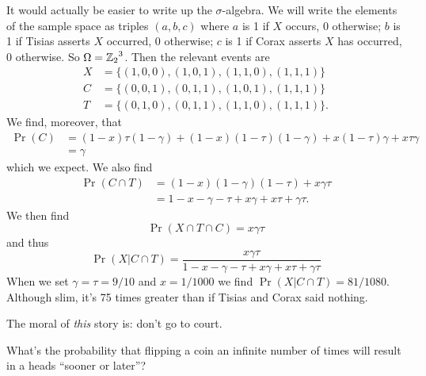 It would actually be easier to write up the $\sigma$-algebra. We will
write the elements of the sample space as triples $(a,b,c)$ where $a$ is
1 if $X$ occurs, 0 otherwise; $b$ is 1 if Tisias asserts $X$ occurred, 0
otherwise; $c$ is 1 if Corax asserts $X$ has occurred, 0 otherwise. So
$\Omega={\mathbb{Z}_{2}}^{3}$. Then the relevant events are
\begin{subequations}
\begin{align}
X&=\{(1,0,0),(1,0,1),(1,1,0),(1,1,1)\}\\
C&=\{(0,0,1),(0,1,1),(1,0,1),(1,1,1)\}\\
T&=\{(0,1,0),(0,1,1),(1,1,0),(1,1,1)\}.
\end{align}
\end{subequations}
We find, moreover, that
\begin{equation}
\begin{split}
\Pr(C)&=(1-x)\tau(1-\gamma)+(1-x)(1-\tau)(1-\gamma)+x(1-\tau)\gamma+x\tau\gamma\\
&=\gamma
\end{split}
\end{equation}
which we expect. We also find
\begin{equation}
\begin{split}
\Pr(C\cap T)&=(1-x)(1-\gamma)(1-\tau)+x\gamma\tau\\
&=1-x-\gamma-\tau+x\gamma+x\tau+\gamma\tau.
\end{split}
\end{equation}
We then find
\begin{equation}
\Pr(X\cap T\cap C)=x\gamma\tau
\end{equation}
and thus
\begin{equation}
\Pr(X|C\cap T)=\frac{x\gamma\tau}{1-x-\gamma-\tau+x\gamma+x\tau+\gamma\tau}
\end{equation}
When we set $\gamma=\tau=9/10$ and $x=1/1000$ we find $\Pr(X|C\cap
T)=81/1080$. Although slim, it's 75 times greater than if Tisias and
Corax said nothing.

The moral of \emph{this} story is: don't go to court.


What's the probability that flipping a coin an infinite number of times
will result in a heads ``sooner or later''?

